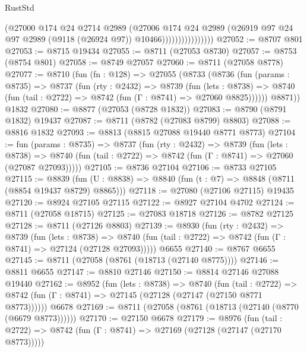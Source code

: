 \begin{lexlean}{RustStd}
\begin{coremodule}
                              (@27000
                                @174
                                @24
                                @2714
                                @2989
                                (@27006
                                  @174
                                  @24
                                  @2989
                                  (@26919
                                    @97
                                    @24
                                    @97
                                    @2989
                                    (@9118 (@26924 @97))
                                    @10466))))))))))))))))
@27052 := @8707 @801
@27053 := @8715 @19434
@27055 := @8711 (@27053 @8730)
@27057 := @8753 (@8754 @801)
@27058 := @8749 @27057
@27060 := @8711 (@27058 @8778)
@27077 := @8710
    (fun (fn : @128) =>
    @27055
      (@8733
        (@8736
          (fun (params : @8735) =>
          @8737
            (fun (rty : @2432) =>
            @8739
              (fun (lets : @8738) =>
              @8740 (fun (tail : @2722) => @8742 (fun (Γ : @8741) => @27060 @8825))))))
        @8871))
    @1832
@27080 := @8877 (@27053 (@8728 @1832))
@27083 := @8790 (@8791 @1832) @19437
@27087 := @8711 (@8782 (@27083 @8799) @8803)
@27088 := @8816 @1832
@27093 := @8813 (@8815 @27088 @19440 @8771 @8773)
@27104 := fun (params : @8735) =>
  @8737
    (fun (rty : @2432) =>
    @8739
      (fun (lets : @8738) =>
      @8740 (fun (tail : @2722) => @8742 (fun (Γ : @8741) => @27060 (@27087 @27093)))))
@27105 := @8736 @27104
@27106 := @8733 @27105
@27115 := @8839
    (fun (U : @8838) => @8840 (fun (t : @7) => @8848 (@8711 (@8854 @19437 @8729) @8865)))
@27118 := @27080 (@27106 @27115) @19435
@27120 := @8924 @27105 @27115
@27122 := @8927 @27104 @4702
@27124 := @8711 (@27058 @18715)
@27125 := @27083 @18718
@27126 := @8782 @27125
@27128 := @8711 (@27126 @8803)
@27139 := @8930
    (fun (rty : @2432) =>
    @8739
      (fun (lets : @8738) =>
      @8740 (fun (tail : @2722) => @8742 (fun (Γ : @8741) => @27124 (@27128 @27093)))))
    @6655
@27140 := @8767 @6655
@27145 := @8711 (@27058 (@8761 (@18713 (@27140 @8775))))
@27146 := @8811 @6655
@27147 := @8810 @27146
@27150 := @8814 @27146 @27088 @19440
@27162 := @8952
    (fun (lets : @8738) =>
    @8740
      (fun (tail : @2722) =>
      @8742 (fun (Γ : @8741) => @27145 (@27128 (@27147 (@27150 @8771 @8773))))))
    @6678
@27169 := @8711 (@27058 (@8761 (@18713 (@27140 (@8770 (@6679 @8773))))))
@27170 := @27150 @6678
@27179 := @8976
    (fun (tail : @2722) => @8742 (fun (Γ : @8741) => @27169 (@27128 (@27147 (@27170 @8773)))))

\end{coremodule}
\end{lexlean}

